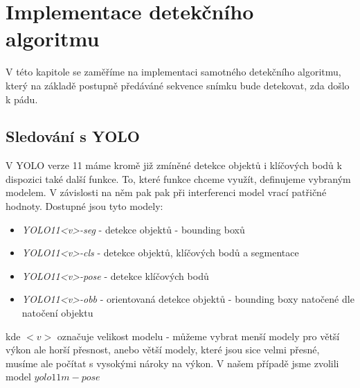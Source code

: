 \chapter{Implementace detekčního algoritmu}
\label{chap:detectionAlgorithm}

V této kapitole se zaměříme na implementaci samotného detekčního algoritmu,
který na základě postupně předáváné sekvence snímku bude detekovat, zda došlo k
pádu.

\section{Sledování s YOLO}

V YOLO verze 11 máme kromě již zmíněné detekce objektů i klíčových bodů k
dispozici také další funkce. To, které funkce chceme využít, definujeme
vybraným modelem. V závislosti na něm pak pak při interferenci model vrací
patřičné hodnoty. Dostupné jsou tyto modely:
\begin{itemize}
    \item \textit{YOLO11<v>-seg }- detekce objektů - bounding boxů
    \item \textit{YOLO11<v>-cls }- detekce objektů, klíčových bodů a segmentace
    \item \textit{YOLO11<v>-pose} - detekce klíčových bodů
    \item \textit{YOLO11<v>-obb }- orientovaná detekce objektů - bounding boxy natočené dle natočení objektu
\end{itemize}

kde $<v>$ označuje velikost modelu - můžeme vybrat menší modely pro větší
výkon ale horší přesnost, anebo větší modely, které jsou sice velmi přesné,
musíme ale počítat s vysokými nároky na výkon. V našem případě jsme zvolili model $yolo11m-pose$

\endinput